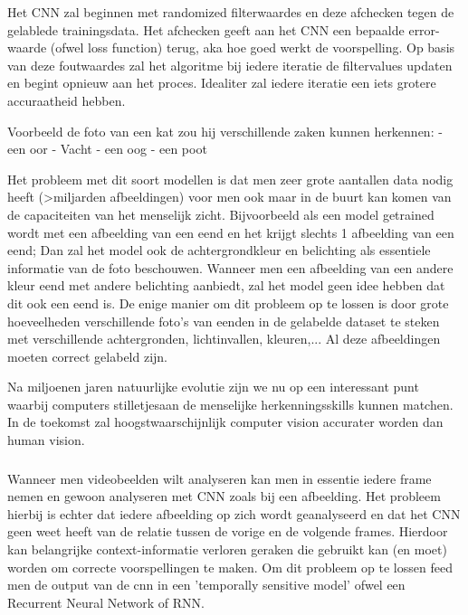 Het CNN zal beginnen met randomized filterwaardes en deze afchecken tegen de gelablede trainingsdata. Het afchecken geeft aan het CNN een bepaalde error-waarde (ofwel loss function) terug, aka hoe goed werkt de voorspelling. Op basis van deze foutwaardes zal het algoritme bij iedere iteratie de filtervalues updaten en begint opnieuw aan het proces. Idealiter zal iedere iteratie een iets grotere accuraatheid hebben.

Voorbeeld de foto van een kat zou hij verschillende zaken kunnen herkennen:
- een oor
- Vacht
- een oog
- een poot

Het probleem met dit soort modellen is dat men zeer grote aantallen data nodig heeft (>miljarden afbeeldingen) voor men ook maar in de buurt kan komen van de capaciteiten van het menselijk zicht. Bijvoorbeeld als een model getrained wordt met een afbeelding van een eend en het krijgt slechts 1 afbeelding van een eend; Dan zal het model ook de achtergrondkleur en belichting als essentiele informatie van de foto beschouwen. Wanneer men een afbeelding van een andere kleur eend met andere belichting aanbiedt, zal het model geen idee hebben dat dit ook een eend is. De enige manier om dit probleem op te lossen is door grote hoeveelheden verschillende foto's van eenden in de gelabelde dataset te steken met verschillende achtergronden, lichtinvallen, kleuren,... Al deze afbeeldingen moeten correct gelabeld zijn.

Na miljoenen jaren natuurlijke evolutie zijn we nu op een interessant punt waarbij computers stilletjesaan de menselijke herkenningsskills kunnen matchen. In de toekomst zal hoogstwaarschijnlijk computer vision accurater worden dan human vision.

\subsubsection{}
\label{sec:recurrent-neural-network}
Wanneer men videobeelden wilt analyseren kan men in essentie iedere frame nemen en gewoon analyseren met CNN zoals bij een afbeelding. Het probleem hierbij is echter dat iedere afbeelding op zich wordt geanalyseerd en dat het CNN geen weet heeft van de relatie tussen de vorige en de volgende frames. Hierdoor kan belangrijke context-informatie verloren geraken die gebruikt kan (en moet) worden om correcte voorspellingen te maken.
Om dit probleem op te lossen feed men de output van de cnn in een 'temporally sensitive model' ofwel een Recurrent Neural Network of RNN.

